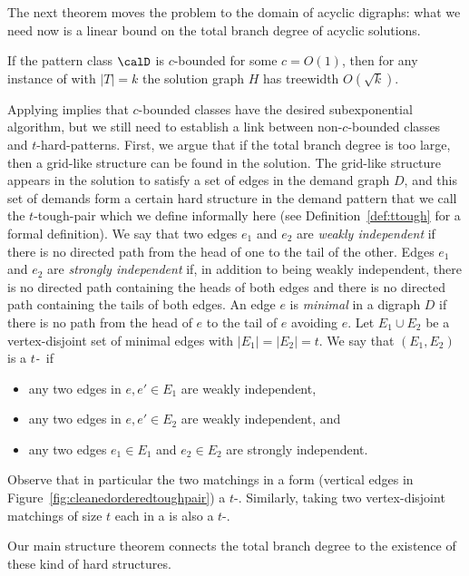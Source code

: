 The next theorem moves the problem to the domain of acyclic digraphs:
what we need now is a linear bound on the total branch degree of acyclic solutions.

\begin{theorem}\label{thm:subexpalgo}
  If the pattern class $\calD$ is $c$-bounded for some $c=O(1)$, then for any instance of \Dsnfull with $|T|=k$ the solution graph $H$ has treewidth $O(\sqrt{k})$.
\end{theorem}

Applying  implies that $c$-bounded classes have the desired subexponential algorithm, but we still need to establish a link between non-$c$-bounded classes and $t$-hard-patterns. First, we argue that if the total
branch degree is too large, then a grid-like structure
can be found in the solution. The grid-like structure appears in the
solution to satisfy a set of edges in the demand graph $D$, and this set of demands form
a certain hard structure in the demand pattern that we call the $t$-tough-pair which we define informally here (see Definition~\ref{def:ttough} for a formal definition). We say that two edges $e_1$ and $e_2$ are \emph{weakly independent} if there is no directed path from the head of one to the tail of the other. Edges $e_1$ and $e_2$ are \emph{strongly independent} if, in addition to being weakly independent, there is no directed path containing the heads of both edges and there is no directed path containing the tails of both edges. An edge $e$ is {\em minimal} in a digraph $D$ if there is no path from the head of $e$ to the tail of $e$ avoiding $e$. Let $E_1\cup E_2$ be a vertex-disjoint set of minimal edges with $|E_1|=|E_2|=t$. We say that $(E_1,E_2)$ is a \emph{$t$-\toughpair}~if
\begin{itemize}
\item any two edges in $e,e'\in E_1$ are weakly independent,
\item any two edges in $e,e'\in E_2$ are weakly independent, and
\item any two edges $e_1\in E_1$ and $e_2\in E_2$ are strongly independent.
\end{itemize}
  Observe that in particular the two matchings in a  form  (vertical edges in Figure~\ref{fig:cleanedorderedtoughpair}) a $t$-\toughpair.
  Similarly, taking two vertex-disjoint matchings of size $t$ each in a  is also a $t$-\toughpair.
  
Our main structure theorem connects the total branch degree to the existence of these kind of hard structures.

